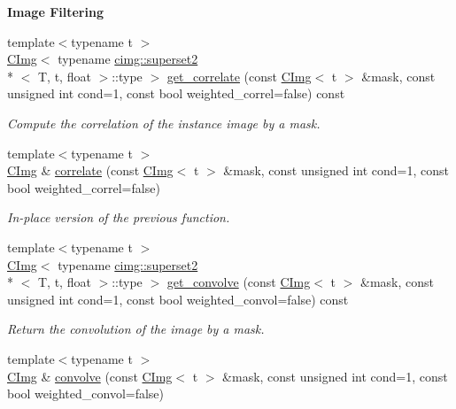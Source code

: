 \begin{Indent}{\bf Image Filtering}\par
\begin{DoxyCompactItemize}
\item 
{\footnotesize template$<$typename t $>$ }\\\hyperlink{structcimg__library_1_1_c_img}{C\-Img}$<$ typename \hyperlink{structcimg__library_1_1cimg_1_1superset2}{cimg\-::superset2}\\*
$<$ T, t, float $>$\-::type $>$ \hyperlink{structcimg__library_1_1_c_img_a5f72fb96161e300a423242c75b6cb655}{get\-\_\-correlate} (const \hyperlink{structcimg__library_1_1_c_img}{C\-Img}$<$ t $>$ \&mask, const unsigned int cond=1, const bool weighted\-\_\-correl=false) const 
\begin{DoxyCompactList}\small\item\em Compute the correlation of the instance image by a mask. \end{DoxyCompactList}\item 
\hypertarget{structcimg__library_1_1_c_img_ae84b4de1f37ffc8ba9121194cd1be361}{{\footnotesize template$<$typename t $>$ }\\\hyperlink{structcimg__library_1_1_c_img}{C\-Img} \& \hyperlink{structcimg__library_1_1_c_img_ae84b4de1f37ffc8ba9121194cd1be361}{correlate} (const \hyperlink{structcimg__library_1_1_c_img}{C\-Img}$<$ t $>$ \&mask, const unsigned int cond=1, const bool weighted\-\_\-correl=false)}\label{structcimg__library_1_1_c_img_ae84b4de1f37ffc8ba9121194cd1be361}

\begin{DoxyCompactList}\small\item\em In-\/place version of the previous function. \end{DoxyCompactList}\item 
{\footnotesize template$<$typename t $>$ }\\\hyperlink{structcimg__library_1_1_c_img}{C\-Img}$<$ typename \hyperlink{structcimg__library_1_1cimg_1_1superset2}{cimg\-::superset2}\\*
$<$ T, t, float $>$\-::type $>$ \hyperlink{structcimg__library_1_1_c_img_a737c500f103b890a821a7d347e99ac41}{get\-\_\-convolve} (const \hyperlink{structcimg__library_1_1_c_img}{C\-Img}$<$ t $>$ \&mask, const unsigned int cond=1, const bool weighted\-\_\-convol=false) const 
\begin{DoxyCompactList}\small\item\em Return the convolution of the image by a mask. \end{DoxyCompactList}\item 
\hypertarget{structcimg__library_1_1_c_img_a08a91a519c1f2b9b384e87e983ebd127}{{\footnotesize template$<$typename t $>$ }\\\hyperlink{structcimg__library_1_1_c_img}{C\-Img} \& \hyperlink{structcimg__library_1_1_c_img_a08a91a519c1f2b9b384e87e983ebd127}{convolve} (const \hyperlink{structcimg__library_1_1_c_img}{C\-Img}$<$ t $>$ \&mask, const unsigned int cond=1, const bool weighted\-\_\-convol=false)}\label{structcimg__library_1_1_c_img_a08a91a519c1f2b9b384e87e983ebd127}


\end{DoxyCompactItemize}
\end{Indent}
